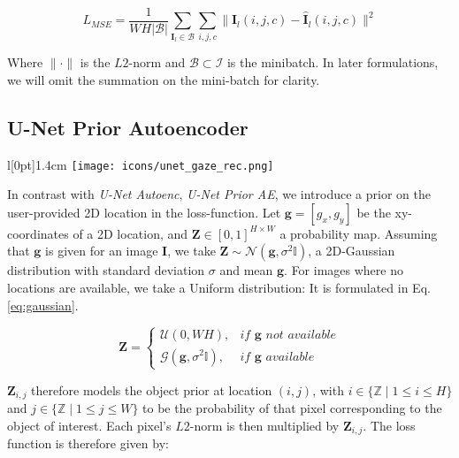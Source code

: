 \begin{equation}
L_{MSE} = \frac{1}{W H |\mathcal{B}|} \sum_{\boldsymbol{I}_l \in \mathcal{B}} \sum_{i,j,c} \|\boldsymbol{I}_l(i,j,c) - \boldsymbol{\hat{I}}_l(i,j,c)\|^2
\label{eq:mse_loss}
\end{equation}
\vspace{6pt}

Where $\| \cdot \|$ is the $L2$-norm and $\mathcal{B} \subset \mathcal{I}$ is the minibatch.
In later formulations, we will omit the summation on the mini-batch for clarity.

\clearpage
\subsection{U-Net Prior Autoencoder} \label{unet_gaze_rec}
\begingroup
\setlength\intextsep{0pt}
\begin{wrapfigure}[4]{l}[0pt]{1.4cm}
\texttt{[image: icons/unet\_gaze\_rec.png]}
\end{wrapfigure}

In contrast with \textit{U-Net Autoenc}, \textit{U-Net Prior AE}, we introduce a prior on the user-provided 2D location in the loss-function.
Let $\boldsymbol{g} = [g_x, g_y]$ be the xy-coordinates of a 2D location, and  $\boldsymbol{Z} \in [0,1]^{H \times W}$ a probability map.
Assuming that $\boldsymbol{g}$ is given for an image $\boldsymbol{I}$, we take $\boldsymbol{Z} \sim \mathcal{N}(\boldsymbol{g}, \sigma^2\mathbb{I})$, a 2D-Gaussian distribution with standard deviation $\sigma$ and mean $\boldsymbol{g}$.
For images where no locations are available, we take a Uniform distribution:
It is formulated in Eq. \ref{eq:gaussian}.

\endgroup

\begin{equation}
\boldsymbol{Z} = 
\begin{cases}
  \mathcal{U}(0,WH),& \textit{if } \boldsymbol{g} \textit{ not available}\\         \mathcal{G}(\boldsymbol{g}, \sigma^2\mathbb{I}),         & \textit{if } \boldsymbol{g} \textit{ available}
\end{cases}
\label{eq:gaussian}
\end{equation}
\hspace{6pt}

$\boldsymbol{Z}_{i,j}$ therefore models the object prior at location $(i,j)$, with $i \in \{\mathbb{Z} \mid 1 \leq i \leq H\}$ and $j \in \{\mathbb{Z} \mid 1 \leq j \leq W\}$ to be the probability of that pixel corresponding to the object of interest. Each pixel's $L2$-norm is then multiplied by $\boldsymbol{Z}_{i,j}$. The loss function is therefore given by:

